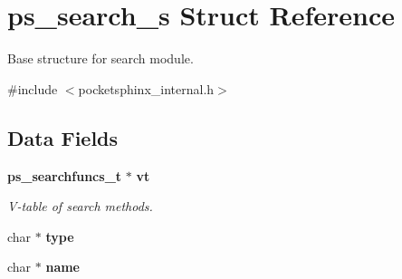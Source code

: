 \section{ps\-\_\-search\-\_\-s Struct Reference}
\label{structps__search__s}


Base structure for search module.  




{\ttfamily \#include $<$pocketsphinx\-\_\-internal.\-h$>$}

\subsection*{Data Fields}
\begin{DoxyCompactItemize}
\item 
{\bf ps\-\_\-searchfuncs\-\_\-t} $\ast$ {\bf vt}
\begin{DoxyCompactList}\small\item\em V-\/table of search methods. \end{DoxyCompactList}\item 
char $\ast$ {\bfseries type}\label{structps__search__s_a2f3a776232b9cc164924c415e6199eec}

\item 
char $\ast$ {\bfseries name}\label{structps__search__s_ab2f99873dc24cee2cdfe9068d41f3617}


\end{DoxyCompactItemize}
